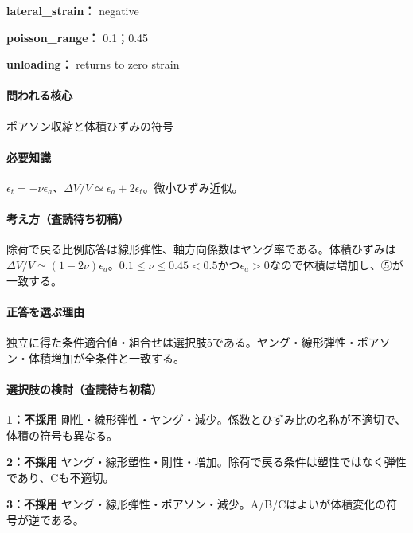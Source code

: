 \noindent\textbf{lateral\_strain：} negative\par

\noindent\textbf{poisson\_range：} 0.1；0.45\par

\noindent\textbf{unloading：} returns to zero strain\par

\paragraph{問われる核心} ポアソン収縮と体積ひずみの符号

\paragraph{必要知識} \(\epsilon_t=-\nu\epsilon_a\)、\(\Delta V/V\simeq\epsilon_a+2\epsilon_t\)。微小ひずみ近似。

\paragraph{考え方（査読待ち初稿）} 除荷で戻る比例応答は線形弾性、軸方向係数はヤング率である。体積ひずみは\(\Delta V/V\simeq(1-2\nu)\epsilon_a\)。\(0.1\le\nu\le0.45<0.5\)かつ\(\epsilon_a>0\)なので体積は増加し、⑤が一致する。

\paragraph{正答を選ぶ理由} 独立に得た条件適合値・組合せは選択肢5である。ヤング・線形弾性・ポアソン・体積増加が全条件と一致する。

\paragraph{選択肢の検討（査読待ち初稿）}\mbox{}\par

\noindent\textbf{1：不採用} 剛性・線形弾性・ヤング・減少。係数とひずみ比の名称が不適切で、体積の符号も異なる。\par

\noindent\textbf{2：不採用} ヤング・線形塑性・剛性・増加。除荷で戻る条件は塑性ではなく弾性であり、Cも不適切。\par

\noindent\textbf{3：不採用} ヤング・線形弾性・ポアソン・減少。A/B/Cはよいが体積変化の符号が逆である。\par

